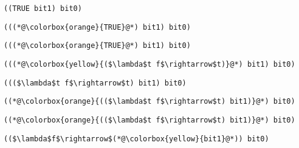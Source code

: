 \documentclass{beamer}
\begin{document}
\begin{frame}[fragile]{\CurrentSection}
\lstset{basicstyle=\ttfamily\small}\lstset{numbers=none}\lstset{language=ML}\begin{lstlisting}
((TRUE bit1) bit0)
\end{lstlisting}
\pause\lstset{language=ML}\begin{lstlisting}
(((*@\colorbox{orange}{TRUE}@*) bit1) bit0)
\end{lstlisting}

\end{frame}

\begin{frame}[fragile]{\CurrentSection}
\lstset{basicstyle=\ttfamily\small}\lstset{numbers=none}\lstset{language=ML}\begin{lstlisting}
(((*@\colorbox{orange}{TRUE}@*) bit1) bit0)
\end{lstlisting}
\pause\lstset{language=ML}\begin{lstlisting}
(((*@\colorbox{yellow}{($\lambda$t f$\rightarrow$t)}@*) bit1) bit0)
\end{lstlisting}

\end{frame}

\begin{frame}[fragile]{\CurrentSection}
\lstset{basicstyle=\ttfamily\small}\lstset{numbers=none}\lstset{language=ML}\begin{lstlisting}
((($\lambda$t f$\rightarrow$t) bit1) bit0)
\end{lstlisting}
\pause\lstset{language=ML}\begin{lstlisting}
((*@\colorbox{orange}{(($\lambda$t f$\rightarrow$t) bit1)}@*) bit0)
\end{lstlisting}

\end{frame}

\begin{frame}[fragile]{\CurrentSection}
\lstset{basicstyle=\ttfamily\small}\lstset{numbers=none}\lstset{language=ML}\begin{lstlisting}
((*@\colorbox{orange}{(($\lambda$t f$\rightarrow$t) bit1)}@*) bit0)
\end{lstlisting}
\pause\lstset{language=ML}\begin{lstlisting}
(($\lambda$f$\rightarrow$(*@\colorbox{yellow}{bit1}@*)) bit0)
\end{lstlisting}

\end{frame}
\end{document}
